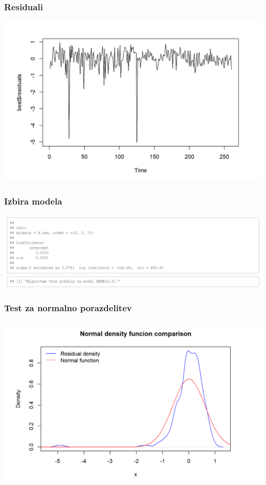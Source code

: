 \documentclass[10pt]{beamer}
\begin{document}
\begin{frame}
\frametitle{Residuali}
\includegraphics[width=1\textwidth]{best_res_B.png}
\end{frame}



\begin{frame}
\frametitle{Izbira modela}
\includegraphics[width=1\textwidth]{ModelB.png}
\end{frame}


\begin{frame}
\frametitle{Test za normalno porazdelitev}
\includegraphics[width=1\textwidth]{normalnaB.png}

\end{frame}
\end{document}
